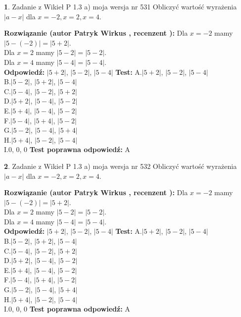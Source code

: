 \documentclass[12pt, a4paper]{article}
\theoremstyle{definition} %
\newtheorem{zad}{}
\newcommand{\zadStart}[1]{\begin{zad}#1\newline}
\newcommand{\zadStop}{\end{zad}}
\newcommand{\rozwStart}[2]{\noindent \textbf{Rozwiązanie (autor #1 , recenzent #2): }\newline}
\newcommand{\rozwStop}{\newline}
\newcommand{\odpStart}{\noindent \textbf{Odpowiedź:}\newline}
\newcommand{\odpStop}{\newline}
\newcommand{\testStart}{\noindent \textbf{Test:}\newline}
\newcommand{\testStop}{\newline}
\newcommand{\kluczStart}{\noindent \textbf{Test poprawna odpowiedź:}\newline}
\newcommand{\kluczStop}{\newline}
\begin{document}
\zadStart{Zadanie z Wikieł P 1.3 a) moja wersja nr 531}
Obliczyć wartość wyrażenia $|a - x|$ dla $x=-2,x=2,x=4$.
\zadStop
\rozwStart{Patryk Wirkus}{}
Dla $x = -2$ mamy $|5 - (-2)| = |5 + 2|$.\\
Dla $x = 2$ mamy $|5 - 2| = |5 - 2|$.\\
Dla $x = 4$ mamy $|5 - 4| = |5 - 4|$.\\
\rozwStop
\odpStart
$|5 + 2|$, $|5 - 2|$, $|5 - 4|$
\odpStop
\testStart
A.$|5 + 2|$, $|5 - 2|$, $|5 - 4|$\\
B.$|5 - 2|$, $|5 + 2|$, $|5 - 4|$\\
C.$|5 - 4|$, $|5 - 2|$, $|5 + 2|$\\
D.$|5 + 2|$, $|5 - 4|$, $|5 - 2|$\\
E.$|5 + 4|$, $|5 - 4|$, $|5 - 2|$\\
F.$|5 - 4|$, $|5 + 4|$, $|5 - 2|$\\
G.$|5 - 2|$, $|5 - 4|$, $|5 + 4|$\\
H.$|5 + 4|$, $|5 - 2|$, $|5 - 4|$\\
I.$0$, $0$, $0$
\testStop
\kluczStart
A
\kluczStop



\zadStart{Zadanie z Wikieł P 1.3 a) moja wersja nr 532}
Obliczyć wartość wyrażenia $|a - x|$ dla $x=-2,x=2,x=4$.
\zadStop
\rozwStart{Patryk Wirkus}{}
Dla $x = -2$ mamy $|5 - (-2)| = |5 + 2|$.\\
Dla $x = 2$ mamy $|5 - 2| = |5 - 2|$.\\
Dla $x = 4$ mamy $|5 - 4| = |5 - 4|$.\\
\rozwStop
\odpStart
$|5 + 2|$, $|5 - 2|$, $|5 - 4|$
\odpStop
\testStart
A.$|5 + 2|$, $|5 - 2|$, $|5 - 4|$\\
B.$|5 - 2|$, $|5 + 2|$, $|5 - 4|$\\
C.$|5 - 4|$, $|5 - 2|$, $|5 + 2|$\\
D.$|5 + 2|$, $|5 - 4|$, $|5 - 2|$\\
E.$|5 + 4|$, $|5 - 4|$, $|5 - 2|$\\
F.$|5 - 4|$, $|5 + 4|$, $|5 - 2|$\\
G.$|5 - 2|$, $|5 - 4|$, $|5 + 4|$\\
H.$|5 + 4|$, $|5 - 2|$, $|5 - 4|$\\
I.$0$, $0$, $0$
\testStop
\kluczStart
A
\kluczStop
\end{document}
